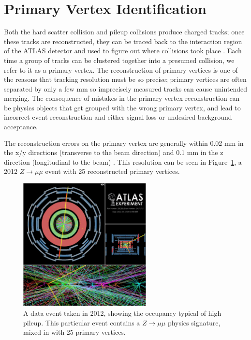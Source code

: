 \section{Primary Vertex Identification}
\label{sec:pv}
Both the hard scatter collision and pileup collisions produce charged tracks; once these tracks are reconstructed, they can 
be traced back to the interaction region of the ATLAS detector and used to figure out where collisions took place
.  Each time a group of tracks can be clustered together into a presumed collision, we refer to it 
as a primary vertex.  The reconstruction of primary vertices is one of the reasons that tracking resolution must be 
so precise; primary vertices are often separated by only a few mm so imprecisely measured tracks can cause unintended 
merging.  The consequence of mistakes in the primary vertex reconstruction can be physics objects that get grouped with the 
wrong primary vertex, and lead to incorrect event reconstruction and either signal loss or undesired background acceptance.

The reconstruction errors on the primary vertex are generally within 0.02 mm in the x/y directions 
(transverse to the beam direction) and 0.1 mm in the z direction (longitudinal to the  
beam) \cite{pileup_tracks}.   This resolution can be seen in Figure~\ref{fig:pileup_pv}, a 2012 
$Z\rightarrow\mu\mu$ event with 25 reconstructed primary vertices.



\begin{figure}
    \center
	\includegraphics[width=0.6\textwidth]{ReconstructionPerformance/images/2012_highPileup.pdf}
	\caption{A data event taken in 2012, showing the occupancy typical of high pileup.  This particular event contains a $Z\rightarrow \mu\mu$ physics signature, mixed in with 25 primary vertices.	\label{fig:pileup_pv}  }
\end{figure}


